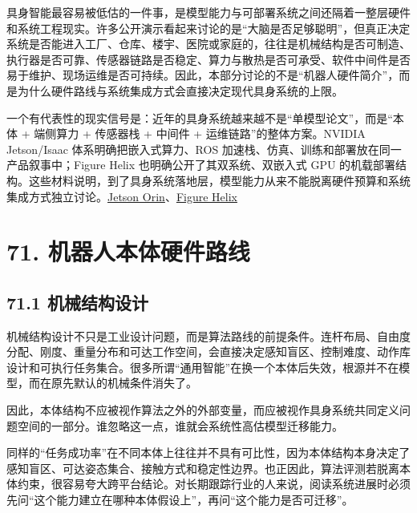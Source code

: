 

具身智能最容易被低估的一件事，是模型能力与可部署系统之间还隔着一整层硬件和系统工程现实。许多公开演示看起来讨论的是“大脑是否足够聪明”，但真正决定系统是否能进入工厂、仓库、楼宇、医院或家庭的，往往是机械结构是否可制造、执行器是否可靠、传感器链路是否稳定、算力与散热是否可承受、软件中间件是否易于维护、现场运维是否可持续。因此，本部分讨论的不是“机器人硬件简介”，而是为什么硬件路线与系统集成方式会直接决定现代具身系统的上限。

一个有代表性的现实信号是：近年的具身系统越来越不是“单模型论文”，而是“本体 + 端侧算力 + 传感器栈 + 中间件 + 运维链路”的整体方案。NVIDIA Jetson/Isaac 体系明确把嵌入式算力、ROS 加速栈、仿真、训练和部署放在同一产品叙事中；Figure Helix 也明确公开了其双系统、双嵌入式 GPU 的机载部署结构。这些材料说明，到了具身系统落地层，模型能力从来不能脱离硬件预算和系统集成方式独立讨论。\href{https://www.nvidia.com/en-us/autonomous-machines/embedded-systems/jetson-orin/}{Jetson Orin}、\href{https://www.figure.ai/news/helix}{Figure Helix}

\section*{71. 机器人本体硬件路线}

\subsection*{71.1 机械结构设计}


机械结构设计不只是工业设计问题，而是算法路线的前提条件。连杆布局、自由度分配、刚度、重量分布和可达工作空间，会直接决定感知盲区、控制难度、动作库设计和可执行任务集合。很多所谓“通用智能”在换一个本体后失效，根源并不在模型，而在原先默认的机械条件消失了。

因此，本体结构不应被视作算法之外的外部变量，而应被视作具身系统共同定义问题空间的一部分。谁忽略这一点，谁就会系统性高估模型迁移能力。

同样的“任务成功率”在不同本体上往往并不具有可比性，因为本体结构本身决定了感知盲区、可达姿态集合、接触方式和稳定性边界。也正因此，算法评测若脱离本体约束，很容易夸大跨平台结论。对长期跟踪行业的人来说，阅读系统进展时必须先问“这个能力建立在哪种本体假设上”，再问“这个能力是否可迁移”。

